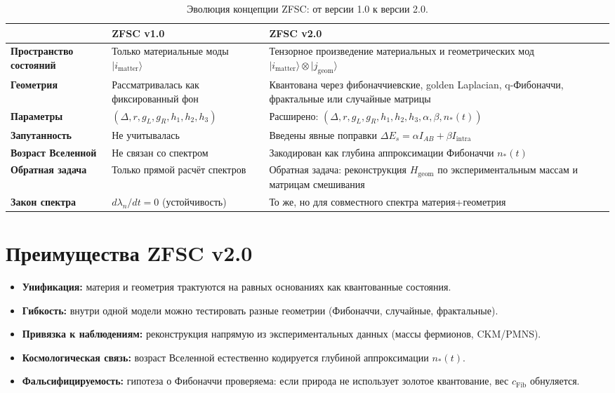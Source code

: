 \documentclass[12pt,a4paper]{article}
\begin{document}
\begin{table}[h!]
\centering
\begin{tabular}{@{}p{4cm}p{5.5cm}p{5.5cm}@{}}
\toprule
 & \textbf{ZFSC v1.0} & \textbf{ZFSC v2.0} \\
\midrule
\textbf{Пространство состояний} & Только материальные моды $|i_{\mathrm{matter}}\rangle$ & Тензорное произведение материальных и геометрических мод $|i_{\mathrm{matter}}\rangle \otimes |j_{\mathrm{geom}}\rangle$ \\
\textbf{Геометрия} & Рассматривалась как фиксированный фон & Квантована через фибоначчиевские, golden Laplacian, q-Фибоначчи, фрактальные или случайные матрицы \\
\textbf{Параметры} & $(\Delta, r, g_L, g_R, h_1,h_2,h_3)$ & Расширено: $(\Delta, r, g_L, g_R, h_1,h_2,h_3, \alpha, \beta, n_*(t))$ \\
\textbf{Запутанность} & Не учитывалась & Введены явные поправки $\Delta E_s = \alpha I_{AB} + \beta I_{\mathrm{intra}}$ \\
\textbf{Возраст Вселенной} & Не связан со спектром & Закодирован как глубина аппроксимации Фибоначчи $n_*(t)$ \\
\textbf{Обратная задача} & Только прямой расчёт спектров & Обратная задача: реконструкция $H_{\mathrm{geom}}$ по экспериментальным массам и матрицам смешивания \\
\textbf{Закон спектра} & $d\lambda_n/dt = 0$ (устойчивость) & То же, но для совместного спектра материя+геометрия \\
\bottomrule
\end{tabular}
\caption{Эволюция концепции ZFSC: от версии 1.0 к версии 2.0.}
\end{table}

\section{Преимущества ZFSC v2.0}
\begin{itemize}
    \item \textbf{Унификация:} материя и геометрия трактуются на равных основаниях как квантованные состояния.  
    \item \textbf{Гибкость:} внутри одной модели можно тестировать разные геометрии (Фибоначчи, случайные, фрактальные).  
    \item \textbf{Привязка к наблюдениям:} реконструкция напрямую из экспериментальных данных (массы фермионов, CKM/PMNS).  
    \item \textbf{Космологическая связь:} возраст Вселенной естественно кодируется глубиной аппроксимации $n_*(t)$.  
    \item \textbf{Фальсифицируемость:} гипотеза о Фибоначчи проверяема: если природа не использует золотое квантование, вес $c_{\mathrm{Fib}}$ обнуляется.  
\end{itemize}
\end{document}
